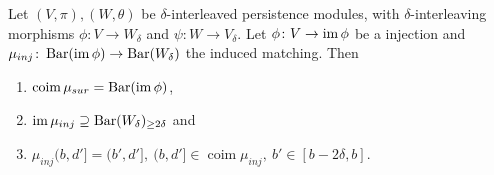 \begin{lemma} \cite[Proposition 3.2.2]{polterovich} \label{lemma:inj-image}
    Let $ (V, \pi), (W, \theta) $ be $\delta$-interleaved persistence modules, with $\delta$-inter\-leaving morphisms $ \phi\colon V \to W_\delta $ and $ \psi\colon W \to V_\delta $. Let $ \phi\colon V \to \operatorname{im}\phi $ be a injection and $ \mu_{inj}\colon \operatorname{Bar}(\operatorname{im} \phi) \to \operatorname{Bar} (W_\delta)$ the induced matching. Then
    \begin{enumerate}
        \item $\operatorname{coim} \mu_{sur} = \operatorname{Bar} (\operatorname{im} \phi) $,
        \item $ \operatorname{im} \mu_{inj} \supseteq \operatorname{Bar} (W_\delta)_{\geq 2\delta} $ and
        \item $ \mu_{inj}(b, d'] = (b', d'], \ (b, d'] \in \operatorname{coim} \mu_{inj}, \ b' \in [b-2\delta, b]$.
    \end{enumerate}
\end{lemma}
